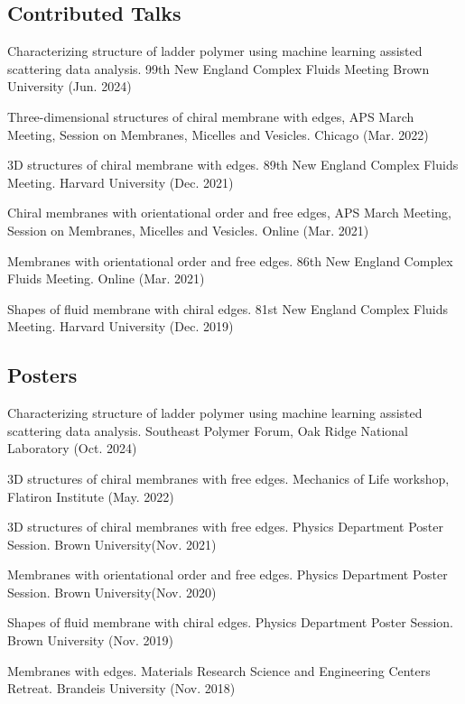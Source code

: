 \documentclass[11pt,letterpaper]{article}
\begin{document}
\subsection*{Contributed Talks}
\begin{etaremune}
    \item Characterizing structure of ladder polymer using machine learning assisted scattering data analysis. 99th New England Complex Fluids Meeting Brown University (Jun. 2024)
    \item Three-dimensional structures of chiral membrane with edges, APS March Meeting, Session on Membranes, Micelles and Vesicles. Chicago (Mar. 2022)
    \item 3D structures of chiral membrane with edges. 89th New England Complex Fluids Meeting. Harvard University (Dec. 2021)
    \item Chiral membranes with orientational order and free edges, APS March Meeting, Session on Membranes, Micelles and Vesicles. Online (Mar. 2021)
    \item Membranes with orientational order and free edges. 86th New England Complex Fluids Meeting. Online (Mar. 2021)
    \item Shapes of fluid membrane with chiral edges. 81st New England Complex Fluids Meeting. Harvard University (Dec. 2019)
\end{etaremune}

\subsection*{Posters}
\begin{etaremune}
    \item Characterizing structure of ladder polymer using machine learning assisted scattering data analysis. Southeast Polymer Forum, Oak Ridge National Laboratory (Oct. 2024)
    \item 3D structures of chiral membranes with free edges. Mechanics of Life workshop, Flatiron Institute (May. 2022)
    \item 3D structures of chiral membranes with free edges. Physics Department Poster Session. Brown University(Nov. 2021)
    \item Membranes with orientational order and free edges. Physics Department Poster Session. Brown University(Nov. 2020)
    \item Shapes of fluid membrane with chiral edges. Physics Department Poster Session. Brown University (Nov. 2019)
    \item Membranes with edges. Materials Research Science and Engineering Centers Retreat. Brandeis University (Nov. 2018)
\end{etaremune}
\end{document}
